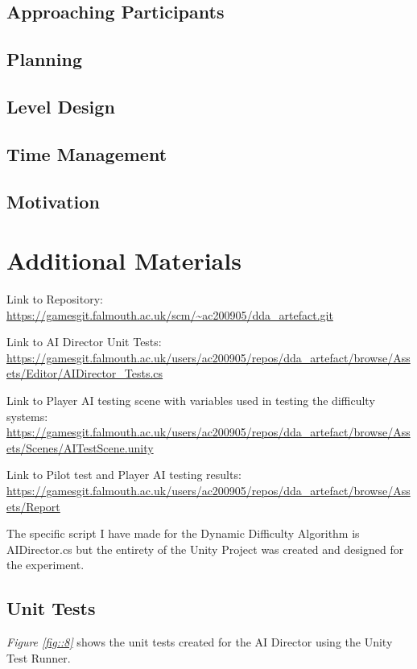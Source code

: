 \documentclass[journal]{IEEEtran}
\begin{document}
\subsection{Approaching Participants}

\subsection{Planning}


\subsection{Level Design}

\subsection{Time Management}

\subsection{Motivation}


\section{Additional Materials}

Link to Repository:
\url{https://gamesgit.falmouth.ac.uk/scm/~ac200905/dda_artefact.git}

Link to AI Director Unit Tests:
\url{https://gamesgit.falmouth.ac.uk/users/ac200905/repos/dda_artefact/browse/Assets/Editor/AIDirector_Tests.cs}

Link to Player AI testing scene with variables used in testing the difficulty systems:
\url{https://gamesgit.falmouth.ac.uk/users/ac200905/repos/dda_artefact/browse/Assets/Scenes/AITestScene.unity}

Link to Pilot test and Player AI testing results:
\url{https://gamesgit.falmouth.ac.uk/users/ac200905/repos/dda_artefact/browse/Assets/Report}

The specific script I have made for the Dynamic Difficulty Algorithm is AIDirector.cs but the entirety of the Unity Project was created and designed for the experiment.

\subsection{Unit Tests}
\textit{Figure \ref{fig::8}} shows the unit tests created for the AI Director using the Unity Test Runner.
\end{document}
